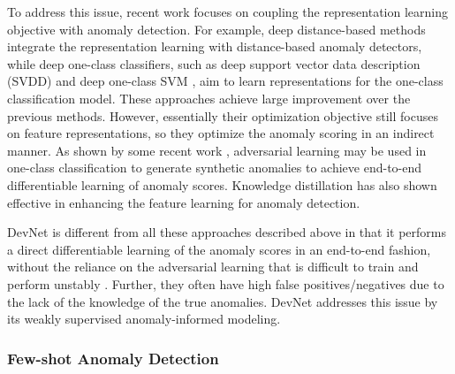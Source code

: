 \documentclass[10pt,journal,compsoc]{IEEEtran}
\begin{document}
To address this issue, recent work \cite{pang2018repen,wang2020unsupervised,ruff2018deepsvdd,ruff2020deep,zong2018deep,chalapathy2018anomaly,wu2019deep,perera2019learning} focuses on coupling the representation learning objective with anomaly detection. For example, deep distance-based methods \cite{pang2018repen,wang2020unsupervised} integrate the representation learning with distance-based anomaly detectors, while deep one-class classifiers, such as deep support vector data description (SVDD) \cite{ruff2018deepsvdd,perera2019learning,ruff2020deep} and deep one-class SVM \cite{chalapathy2018anomaly,wu2019deep}, aim to learn representations for the one-class classification model. These approaches achieve large improvement over the previous methods. However, essentially their optimization objective still focuses on feature representations, so they optimize the anomaly scoring in an indirect manner. As shown by some recent work \cite{zenati2018gan,sabokrou2018adversarially,zaheer2020old,sabokrou2020deep,zheng2019one}, adversarial learning may be used in one-class classification to generate synthetic anomalies to achieve end-to-end differentiable learning of anomaly scores. Knowledge distillation \cite{bergmann2020uninformed,salehi2021multiresolution} has also shown effective in enhancing the feature learning for anomaly detection.

DevNet is different from all these approaches described above in that it performs a direct differentiable learning of the anomaly scores in an end-to-end fashion, without the reliance on the adversarial learning that is difficult to train and perform unstably \cite{zaheer2020old}. Further, they often have high false positives/negatives due to the lack of the knowledge of the true anomalies. DevNet addresses this issue by its weakly supervised anomaly-informed modeling.

\subsubsection{Few-shot Anomaly Detection}
\end{document}
